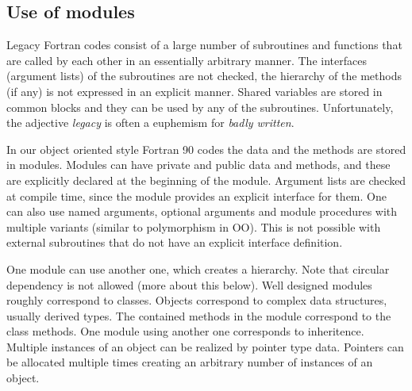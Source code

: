 \documentclass{article}
\begin{document}
\subsection{Use of modules}

Legacy Fortran codes consist of a large number of subroutines and functions
that are called by each other in an essentially arbitrary manner. The 
interfaces (argument lists) of the subroutines are not checked, the
hierarchy of the methods (if any) is not expressed in an explicit manner.
Shared variables are stored in common blocks and they can be used by any
of the subroutines. Unfortunately, the adjective {\it legacy} 
is often a euphemism for {\it badly written}.

In our object oriented style Fortran 90 codes the data and the methods are 
stored in modules. 
Modules can have private and public data and methods, and these are explicitly
declared at the beginning of the module. Argument lists are checked at compile
time, since the module provides an explicit interface for them. One can
also use named arguments, optional arguments and module procedures with
multiple variants (similar to polymorphism in OO). 
This is not possible with external subroutines that do
not have an explicit interface definition.

One module can use another one, which creates a hierarchy. 
Note that circular dependency is 
not allowed (more about this below). Well designed modules roughly correspond
to classes. Objects correspond to complex data structures, usually derived 
types. The contained methods in the module correspond to the class methods.
One module using another one corresponds to inheritence. Multiple instances
of an object can be realized by pointer type data. Pointers can be allocated
multiple times creating an arbitrary number of instances of an object.
\end{document}

